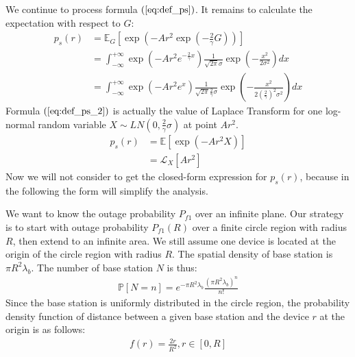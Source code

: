 We continue to process formula $(\ref{eq:def_ps})$. It remains to calculate the expectation with respect to $G$:
\begin{align}
	\label{eq:def_ps_2}
	p_{s}(r) &= \mathbb{E}_{G}\left[ \exp(-A r^2 \exp(-\frac{2}{\gamma}G)) \right] \nonumber\\
	&=\int_{-\infty}^{+\infty} \exp(-A r^2 e^{-\frac{2}{\gamma}x})\frac{1}{\sqrt{2\pi}\sigma} \exp(-\frac{x^2}{2\sigma^2}) dx \nonumber\\
	&=\int_{-\infty}^{+\infty} \exp(-A r^2 e^{x})\frac{1}{\sqrt{2\pi}\frac{2}{\gamma}\sigma} \exp(-\frac{x^2}{2(\frac{2}{\gamma})^2\sigma^2}) dx 
\end{align}
Formula $(\ref{eq:def_ps_2})$ is actually the value of Laplace Transform for one log-normal random variable $X \sim LN(0, \frac{2}{\gamma}\sigma)$ at point $Ar^2$.
\begin{align}
	p_{s}(r) &= \mathbb{E}\left[ \exp(-Ar^2X)\right] \nonumber\\
	&= \mathcal{L}_{X} \left[ Ar^2\right]  
\end{align}
Now we will not consider to get the closed-form expression for $p_{s}(r)$, because in the following the form will simplify the analysis. 

We want to know the outage probability $P_{f1}$ over an infinite plane. Our strategy is to start with outage probability $P_{f1}(R)$ over a finite circle region with radius $R$, then extend to an infinite area. We still assume one device is located at the origin of the circle region with radius $R$. The spatial density of base station is $\pi R^2 \lambda_b$. The number of base station $N$ is thus:
\begin{align}
	\mathbb{P}\left[ N=n\right] = e^{-\pi R^2 \lambda_b}\frac{\left( \pi R^2 \lambda_b\right) ^n}{n!} 
\end{align}
Since the base station is uniformly distributed in the circle region, the probability density function of distance between a given base station and the device $r$ at the origin is as follows:
\begin{align}
	f\left(r\right) = \frac{2r}{R^2}, r \in \left[ 0, R\right]  
\end{align} 

